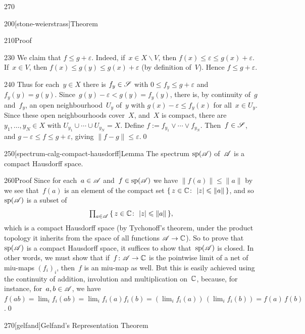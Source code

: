 \begin{parsec}{270}
\begin{point}{200}[stone-weierstrass]{Theorem}
\begin{point}{210}{Proof}
\begin{point}{230}
We claim that $f\leq g+\varepsilon$.
Indeed,
if~$x\in X\backslash V$,
then $f(x)\leq \varepsilon\leq g(x)+\varepsilon$.
If~$x\in V$,
then $f(x)\leq g(y)\leq g(x)+\varepsilon$
(by definition of~$V$).
Hence $f\leq g+\varepsilon$.
\end{point}
\begin{point}{240}%
Thus for each~$y\in X$
there is $f_y\in \mathscr{S}$ with $0\leq f_y \leq g+\varepsilon$
and~$f_y(y)=g(y)$.
Since~$g(y)-\varepsilon<g(y)=f_y(y)$,
there is, by continuity of~$g$ and~$f_y$,
an open neighbourhood~$U_y$ of~$y$
with $g(x)-\varepsilon\leq f_y(x)$
for all~$x\in U_y$.
Since these open neighbourhoods cover~$X$,
and~$X$ is compact,
there are $y_1,\dotsc,y_N\in X$
with $U_{y_1}\cup\dotsb\cup U_{y_N} = X$.
Define $f:=f_{y_1}\vee \dotsb\vee f_{y_N}$.
Then~$f\in\mathscr{S}$,
and $g-\varepsilon \leq f\leq g+\varepsilon$,
giving $\|f-g\|\leq \varepsilon$.\qed
\end{point}
\end{point}
\end{point}
\begin{point}{250}[spectrum-calg-compact-hausdorff]{Lemma}%
The spectrum $\mathrm{sp}(\mathscr{A})$ of~$\mathscr{A}$ is a compact Hausdorff space.
\begin{point}{260}{Proof}%
Since for each~$a\in \mathscr{A}$
and~$f\in \mathrm{sp}(\mathscr{A})$
we have  $\|f(a)\|\leq \|a\|$ 
by~
we see that~$f(a)$ is an element of the compact set
$\{\,z\in \mathbb{C}\colon\, \left|z\right|\leqslant\|a\|\,\}$,
and so~$\mathrm{sp}(\mathscr{A})$ is a subset of
\begin{equation*}
\textstyle
\prod_{a\in \mathscr{A}}\, \{\,z\in \mathbb{C}\colon\, \left|z\right|\leqslant \|a\|\,\},
\end{equation*}
which is a compact Hausdorff space
(by Tychonoff's theorem, under the product topology
it inherits
from the space of all functions $\mathscr{A}\to \mathbb{C}$).
So to prove that~$\mathrm{sp}(\mathscr{A})$
is a compact Hausdorff space,
it suffices to show that~$\mathrm{sp}(\mathscr{A})$
is closed.
In other words,
we must show that if~$f\colon \mathscr{A}\to \mathbb{C}$
is the pointwise limit of a net of miu-maps $(f_i)_i$,
then~$f$ is an miu-map as well.
But this is easily achieved
using the continuity of addition, involution and multiplication on~$\mathbb{C}$,
because, for instance, 
for~$a,b\in\mathscr{A}$, we have $f(ab)
= \lim_i f_i(ab)=\lim_i f_i(a)f_i(b)
 = (\lim_i f_i(a))\,(\lim_i f_i(b))
= f(a) \,f(b)$.\qed
\end{point}
\end{point}
\begin{point}{270}[gelfand]{Gelfand's Representation Theorem}%
%

\end{point}
\end{parsec}
